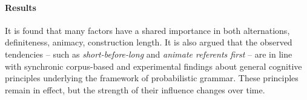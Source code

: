 {\begin{minipage}{\textwidth}
  \paragraph{Results}

  It is found that many factors have a shared importance in both alternations, \eg definiteness, animacy, construction length.
  It is also argued that the observed tendencies -- such as \textit{short-before-long} and \textit{animate referents first} -- are in line with synchronic corpus-based and experimental findings about general cognitive principles underlying the framework of probabilistic grammar.
  These principles remain in effect, but the strength of their influence changes over time.

\end{minipage}}

\newpage

